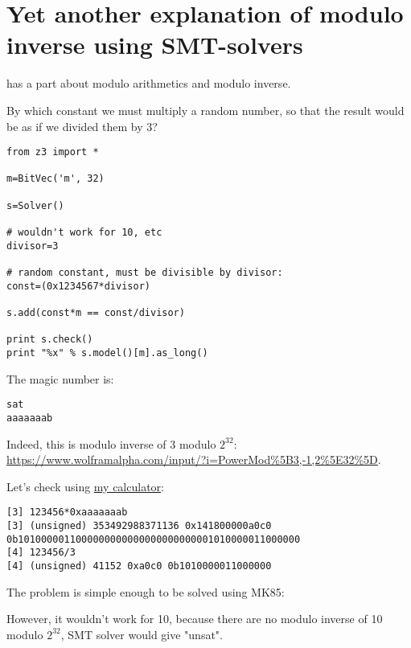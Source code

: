 \section{Yet another explanation of modulo inverse using SMT-solvers}

\MathForProg has a part about modulo arithmetics and modulo inverse.

By which constant we must multiply a random number, so that the result would be as if we divided them by 3?

\begin{lstlisting}
from z3 import *

m=BitVec('m', 32)

s=Solver()

# wouldn't work for 10, etc
divisor=3

# random constant, must be divisible by divisor:
const=(0x1234567*divisor)

s.add(const*m == const/divisor)

print s.check()
print "%x" % s.model()[m].as_long()
\end{lstlisting}

The magic number is:

\begin{lstlisting}
sat
aaaaaaab
\end{lstlisting}

Indeed, this is modulo inverse of 3 modulo $2^{32}$: \url{https://www.wolframalpha.com/input/?i=PowerMod%5B3,-1,2%5E32%5D}.

Let's check using \href{https://github.com/DennisYurichev/progcalc}{my calculator}:

\begin{lstlisting}
[3] 123456*0xaaaaaaab
[3] (unsigned) 353492988371136 0x141800000a0c0 0b1010000011000000000000000000000001010000011000000
[4] 123456/3
[4] (unsigned) 41152 0xa0c0 0b1010000011000000
\end{lstlisting}

The problem is simple enough to be solved using MK85:





However, it wouldn't work for 10, because there are no modulo inverse of 10 modulo $2^{32}$, SMT solver would give "unsat".

